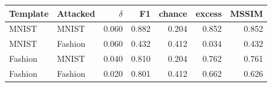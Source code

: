 \begin{tabular}{llrrrrr}
\hline
Template & Attacked & $\delta$ & F1 & chance & excess & MSSIM \\
\hline
MNIST & MNIST & 0.060 & 0.882 & 0.204 & 0.852 & 0.852 \\
MNIST & Fashion & 0.060 & 0.432 & 0.412 & 0.034 & 0.432 \\
Fashion & MNIST & 0.040 & 0.810 & 0.204 & 0.762 & 0.761 \\
Fashion & Fashion & 0.020 & 0.801 & 0.412 & 0.662 & 0.626 \\
\hline
\end{tabular}
